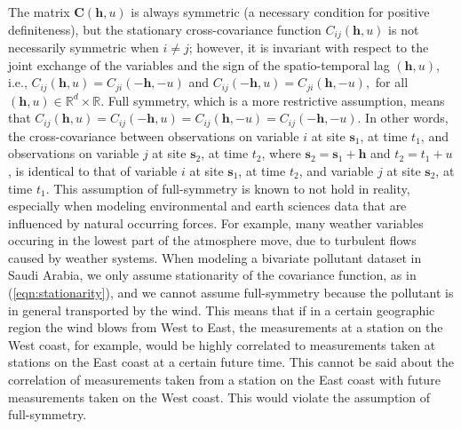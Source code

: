 \documentclass[12pt]{article}
\newcommand{\0}{\mathbf{0}}
\begin{document}
The matrix $\mathbf{C}(\mathbf{h},u)$ is always symmetric (a necessary condition for positive definiteness), but the stationary cross-covariance function $C_{ij}(\mathbf{h},u)$ is not necessarily symmetric when $i\neq j$; however, it is invariant with respect to the joint exchange of the variables and the sign of the spatio-temporal lag $(\mathbf{h},u)$, i.e., $C_{ij}(\mathbf{h},u)=C_{ji}(-\mathbf{h},-u)$ and $C_{ij}(-\mathbf{h},u)=C_{ji}(\mathbf{h},-u),$ for all $(\mathbf{h},u) \in \mathbb{R}^{d}\times \mathbb{R}$. Full symmetry, which is a more restrictive assumption, means that $C_{ij}(\mathbf{h},u)=C_{ij}(-\mathbf{h},u)=C_{ij}(\mathbf{h},-u)=C_{ij}(-\mathbf{h},-u)$. In other words, the cross-covariance between observations on variable $i$ at site $\mathbf{s}_1$, at time $t_1$, and observations on variable $j$ at site $\mathbf{s}_2$, at time $t_2$, where $\mathbf{s}_2=\mathbf{s}_1+\mathbf{h}$ and $t_2=t_1+u$, is identical to that of variable $i$ at site $\mathbf{s}_1$, at time $t_2$, and variable $j$ at site $\mathbf{s}_2$, at time $t_1$. This assumption of full-symmetry is known to not hold in reality, especially when modeling environmental and earth sciences data that are influenced by natural occurring forces. For example, many weather variables occuring in the lowest part of the atmosphere move, due to turbulent flows caused by weather systems. When modeling a bivariate pollutant dataset in Saudi Arabia, we only assume stationarity of the covariance function, as in (\ref{eqn:stationarity}), and we cannot assume full-symmetry because the pollutant is in general transported by the wind. This means that if in a certain geographic region the wind blows from West to East, the measurements at a station on the West coast, for example, would be highly correlated to measurements taken at stations on the East coast at a certain future time. This cannot be said about the correlation of measurements taken from a station on the East coast with future measurements taken on the West coast. This would violate the assumption of full-symmetry. 

\end{document}
